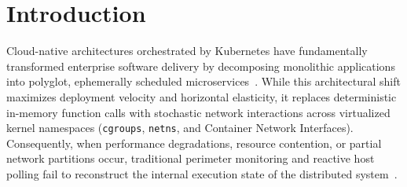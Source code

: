 \section{Introduction}
\label{sec:introduction}

Cloud-native architectures orchestrated by Kubernetes have fundamentally transformed enterprise software delivery by decomposing monolithic applications into polyglot, ephemerally scheduled microservices~\cite{beyer_2016, majors_2022}. While this architectural shift maximizes deployment velocity and horizontal elasticity, it replaces deterministic in-memory function calls with stochastic network interactions across virtualized kernel namespaces (\texttt{cgroups}, \texttt{netns}, and Container Network Interfaces). Consequently, when performance degradations, resource contention, or partial network partitions occur, traditional perimeter monitoring and reactive host polling fail to reconstruct the internal execution state of the distributed system~\cite{sridharan_2018, sigelman_2010}.

